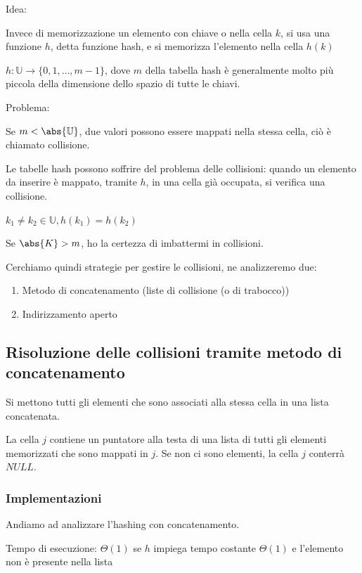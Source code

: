 \documentclass[11pt,a4paper,twoside,openright]{book}
\providecommand{\tightlist}{\setlength{\itemsep}{0pt}\setlength{\parskip}{0pt}}
\begin{document}
{Idea:}

{Invece di memorizzazione un elemento con chiave o nella cella $k$, si usa una funzione $h$, detta funzione hash, e si memorizza l'elemento nella cella $h(k)$}


{$h:\mathbb{U}\rightarrow\{0,1,\ldots,m-1\}$, dove $m$ della tabella hash è generalmente molto più piccola della dimensione dello spazio di tutte le chiavi.}

{Problema: }

{Se $m < \abs{\mathbb{U}}$, due valori possono essere mappati nella stessa cella, ciò è chiamato collisione. }

{Le tabelle hash possono soffrire del problema delle collisioni: quando un elemento da inserire è mappato, tramite $h$, in una cella già occupata, si verifica una collisione.}

$k_1 \neq k_2 \in \mathbb{U}, h(k_1) = h(k_2)$

{Se $\abs{K} > m$, ho la certezza di imbattermi in collisioni.}

{Cerchiamo quindi strategie per gestire le collisioni, ne analizzeremo due:}

\begin{enumerate}
\tightlist
\item
  {Metodo di concatenamento (liste di collisione (o di trabocco))}
\item
  {Indirizzamento aperto}
\end{enumerate}

\subsection{Risoluzione delle collisioni tramite metodo di concatenamento}

{Si mettono tutti gli elementi che sono associati alla stessa cella in una lista concatenata.}

{La cella $j$ contiene un puntatore alla testa di una lista di tutti gli elementi memorizzati che sono mappati in $j$. Se non ci sono elementi, la cella $j$ conterrà $NULL$.}

\subsubsection{Implementazioni}

{Andiamo ad analizzare l'hashing con concatenamento.}



{Tempo di esecuzione: $\Theta(1)$ se $h$ impiega tempo costante $\Theta(1)$ e l'elemento non è presente nella lista}
\end{document}
